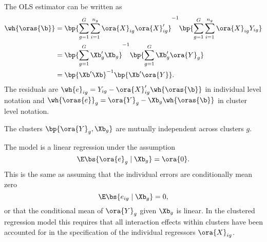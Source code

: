 The OLS estimator can be written as 
\begin{equation}
    \label{hansen_eq_4_44}
    \begin{aligned}
        \wh{\oras{\b}} & = \bp{\sum_{g=1}^{G}\sum_{i=1}^{n_g} \ora{X}_{ig}\ora{X}_{ig}^\prime}^{-1} \bp{\sum_{g=1}^{G}\sum_{i=1}^{n_g} \ora{X}_{ig} Y_{ig}} \\
        & = \bp{\sum_{g=1}^{G} \Xb_{g}^\prime\Xb_{g}}^{-1} \bp{\sum_{g=1}^{G} \Xb_g^\prime \ora{Y}_g} \\
        & = \bp{\Xb^\prime \Xb}^{-1} \bp{\Xb^\prime \ora{Y}}.
    \end{aligned}
\end{equation}
The residuals are $\wh{e}_{ig} = Y_{ig} - \ora{X}_{ig}^\prime \wh{\oras{\b}}$ in individual level notation and $\wh{\oras{e}}_g = \ora{Y}_g - \Xb_g \wh{\oras{\b}}$ in cluster level notation.

\begin{assumption}
    \label{hansen_ass_4_4}
    The clusters $\bp{\ora{Y}_g, \Xb_g}$ are mutually independent across clusters $g$.
\end{assumption}

The model is a linear regression under the assumption 
\begin{equation}
    \label{hansen_eq_4_45}
    \E\bs{\ora{e}_g \mid \Xb_g} = \ora{0}.
\end{equation}
This is the same as assuming that the individual errors are conditionally mean zero
\begin{equation}
    \notag
    \E\bs{e_{ig} \mid \Xb_g} = 0,
\end{equation}
or that the conditional mean of $\ora{Y}_g$ given $\Xb_g$ is linear.  In the clustered regression model this requires that all interaction effects within clusters have been accounted for in the specification of the individual regressors $\ora{X}_{ig}$.

